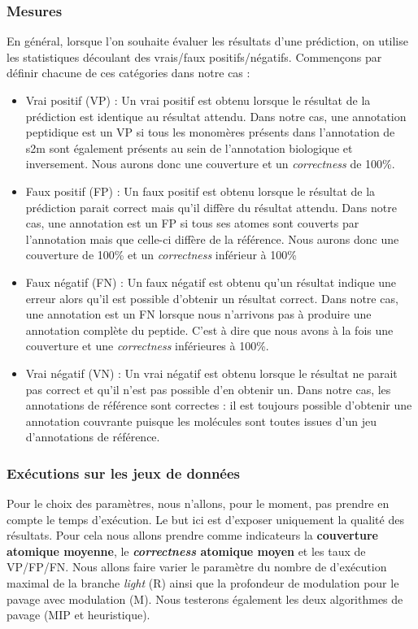 \subsubsection{Mesures}

En général, lorsque l'on souhaite évaluer les résultats d'une prédiction, on utilise les statistiques découlant des vrais/faux positifs/négatifs.
Commençons par définir chacune de ces catégories dans notre cas :
\begin{itemize}
 \item Vrai positif (VP) : Un vrai positif est obtenu lorsque le résultat de la prédiction est identique au résultat attendu.
Dans notre cas, une annotation peptidique est un VP si tous les monomères présents dans l'annotation de s2m sont également présents au sein de l'annotation biologique et inversement.
Nous aurons donc une couverture et un \textit{correctness} de 100\%.
 \item Faux positif (FP) : Un faux positif est obtenu lorsque le résultat de la prédiction parait correct mais qu'il diffère du résultat attendu.
Dans notre cas, une annotation est un FP si tous ses atomes sont couverts par l'annotation mais que celle-ci diffère de la référence.
Nous aurons donc une couverture de 100\% et un \textit{correctness} inférieur à 100\%
 \item Faux négatif (FN) : Un faux négatif est obtenu qu'un résultat indique une erreur alors qu'il est possible d'obtenir un résultat correct.
Dans notre cas, une annotation est un FN lorsque nous n'arrivons pas à produire une annotation complète du peptide.
C'est à dire que nous avons à la fois une couverture et une \textit{correctness} inférieures à 100\%.
 \item Vrai négatif (VN) : Un vrai négatif est obtenu lorsque le résultat ne parait pas correct et qu'il n'est pas possible d'en obtenir un.
Dans notre cas, les annotations de référence sont correctes : il est toujours possible d'obtenir une annotation couvrante puisque les molécules sont toutes issues d'un jeu d'annotations de référence.
\end{itemize}


\subsubsection{Exécutions sur les jeux de données}

\label{resultats_s2m_p}

Pour le choix des paramètres, nous n'allons, pour le moment, pas prendre en compte le temps d'exécution.
Le but ici est d'exposer uniquement la qualité des résultats.
Pour cela nous allons prendre comme indicateurs la \textbf{couverture atomique moyenne}, le \textbf{\textit{correctness} atomique moyen} et les taux de VP/FP/FN.
Nous allons faire varier le paramètre du nombre de d'exécution maximal de la branche \textit{light} (R) ainsi que la profondeur de modulation pour le pavage avec modulation (M).
Nous testerons également les deux algorithmes de pavage (MIP et heuristique).

